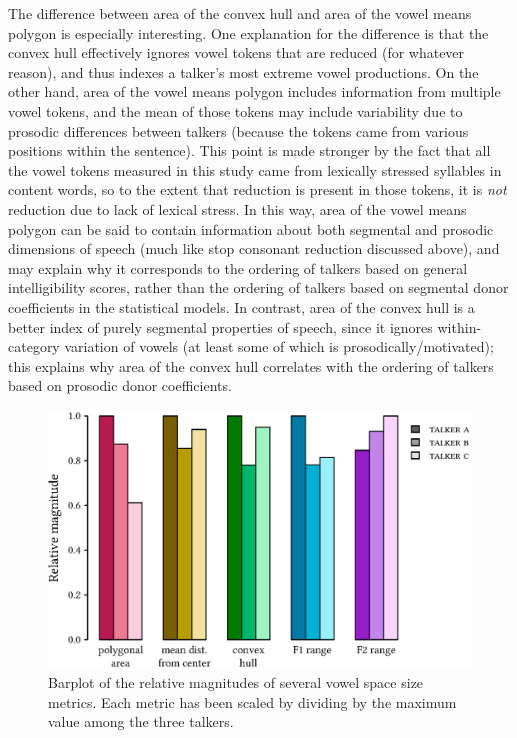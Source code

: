 The difference between area of the convex hull and area of the vowel means polygon is especially interesting.  One explanation for the difference is that the convex hull effectively ignores vowel tokens that are reduced (for whatever reason), and thus indexes a talker’s most extreme vowel productions.  On the other hand, area of the vowel means polygon includes information from multiple vowel tokens, and the mean of those tokens may include variability due to prosodic differences between talkers (because the tokens came from various positions within the sentence).  This point is made stronger by the fact that all the vowel tokens measured in this study came from lexically stressed syllables in content words, so to the extent that reduction is present in those tokens, it is \emph{not} reduction due to lack of lexical stress.  In this way, area of the vowel means polygon can be said to contain information about both segmental and prosodic dimensions of speech (much like stop consonant reduction discussed above), and may explain why it corresponds to the ordering of talkers based on general intelligibility scores, rather than the ordering of talkers based on segmental donor coefficients in the statistical models.  In contrast, area of the convex hull is a better index of purely segmental properties of speech, since it ignores within-category variation of vowels (at least some of which is prosodically\-/motivated); this explains why area of the convex hull correlates with the ordering of talkers based on prosodic donor coefficients.


\begin{figure}[bt]
	\begin{centering}
	\includegraphics{figures/posthocs/VowelSpace.eps}
	\caption[Barplot of vowel space size metrics]{Barplot of the relative magnitudes of several vowel space size metrics.  Each metric has been scaled by dividing by the maximum value among the three talkers.\label{fig:VowelSpace}}
	\end{centering}
\end{figure}

